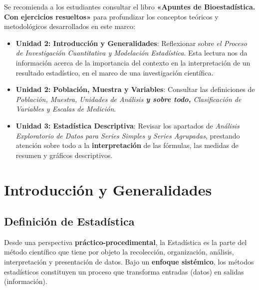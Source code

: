 \documentclass[
  spanish,
  letterpaper,
  DIV=11,
  numbers=noendperiod]{scrreprt}
\providecommand{\tightlist}{%
  \setlength{\itemsep}{0pt}\setlength{\parskip}{0pt}}
\begin{document}
\begin{tcolorbox}[enhanced jigsaw, arc=.35mm, bottomrule=.15mm, bottomtitle=1mm, breakable, colback=white, colbacktitle=quarto-callout-important-color!10!white, colframe=quarto-callout-important-color-frame, coltitle=black, left=2mm, leftrule=.75mm, opacityback=0, opacitybacktitle=0.6, rightrule=.15mm, title=\textcolor{quarto-callout-important-color}{\faExclamation}\hspace{0.5em}{Lectura Sugerida para el Trabajo Práctico}, titlerule=0mm, toprule=.15mm, toptitle=1mm]

Se recomienda a los estudiantes consultar el libro \textbf{«Apuntes de
Bioestadística. Con ejercicios resueltos»} para profundizar los
conceptos teóricos y metodológicos desarrollados en este marco:

\begin{itemize}
\tightlist
\item
  \textbf{Unidad 2: Introducción y Generalidades}: Reflexionar sobre
  \emph{el Proceso de Investigación Cuantitativa y Modelación
  Estadística}. Esta lectura nos da información acerca de la importancia
  del contexto en la interpretación de un resultado estadístico, en el
  marco de una investigación científica.
\item
  \textbf{Unidad 2: Población, Muestra y Variables}: Consultar las
  definiciones de \emph{Población, Muestra, Unidades de Análisis
  \textbf{y sobre todo,} Clasificación de Variables y Escalas de
  Medición}.
\item
  \textbf{Unidad 3: Estadística Descriptiva}: Revisar los apartados de
  \emph{Análisis Exploratorio de Datos para Series Simples y Series
  Agrupadas}, prestando atención sobre todo a la \textbf{interpretación}
  de las fórmulas, las medidas de resumen y gráficos descriptivos.
\end{itemize}

\end{tcolorbox}

\section{Introducción y
Generalidades}\label{introducciuxf3n-y-generalidades}

\subsection{Definición de
Estadística}\label{definiciuxf3n-de-estaduxedstica}

Desde una perspectiva \textbf{práctico-procedimental}, la Estadística es
la parte del método científico que tiene por objeto la recolección,
organización, análisis, interpretación y presentación de datos. Bajo un
\textbf{enfoque sistémico}, los métodos estadísticos constituyen un
proceso que transforma entradas (datos) en salidas (información).
\end{document}

